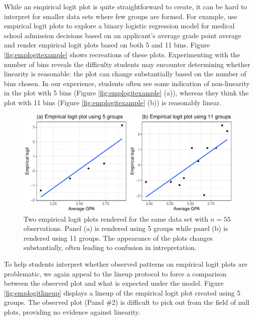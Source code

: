 \documentclass[12pt]{article}
\begin{document}
While an empirical logit plot is quite straightforward to create, it can
be hard to interpret for smaller data sets where few groups are formed.
For example, \citet{stat2} use empirical logit plots to explore a binary
logistic regression model for medical school admission decisions based
on an applicant's average grade point average and render empirical logit
plots based on both 5 and 11 bins. Figure \ref{fig:emplogitexample}
shows recreations of these plots. Experimenting with the number of bins
reveals the difficulty students may encounter determining whether
linearity is reasonable: the plot can change substantially based on the
number of bins chosen. In our experience, students often see some
indication of non-linearity in the plot with 5 bins (Figure
\ref{fig:emplogitexample} (a)), whereas they think the plot with 11 bins
(Figure \ref{fig:emplogitexample} (b)) is reasonably linear.

\clearpage

\begin{figure}

{\centering \includegraphics[width=0.8\linewidth]{figs/unnamed-chunk-7-1} 

}

\caption{\label{fig:emplogitexample} Two empirical logit plots rendered for the same data set with $n=55$ observations. Panel (a) is rendered using 5 groups while panel (b) is rendered using 11 groups. The appearance of the plots changes substantially, often leading to confusion in intrepretation.}\label{fig:unnamed-chunk-7}
\end{figure}

To help students interpret whether observed patterns on empirical logit
plots are problematic, we again appeal to the lineup protocol to force a
comparison between the observed plot and what is expected under the
model. Figure \ref{fig:emplogitlineup} displays a lineup of the
empirical logit plot created using 5 groups. The observed plot (Panel
\#2) is difficult to pick out from the field of null plots, providing no
evidence against linearity.
\end{document}
